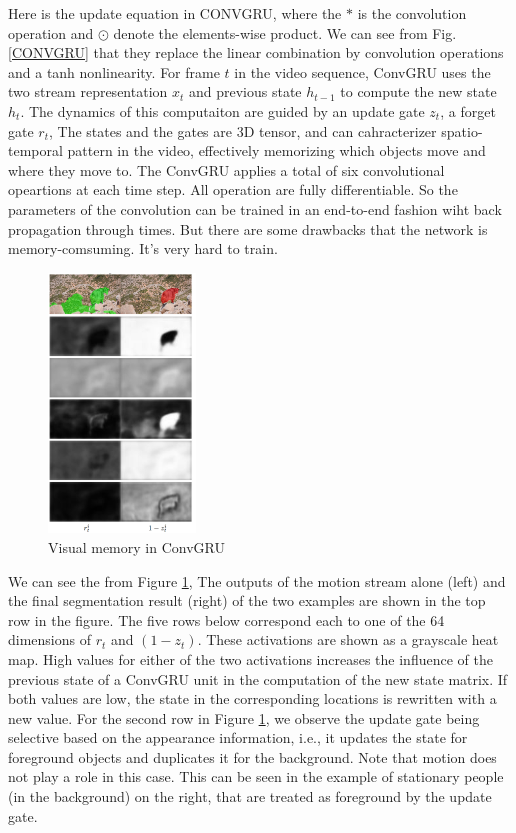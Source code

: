 Here is the update equation in CONVGRU, where the $*$ is the convolution operation and $\odot$ denote the elements-wise product.
We can see from Fig.\ref{CONVGRU} that they replace the linear combination by convolution operations and a tanh nonlinearity. For frame $t$ in the video
sequence, ConvGRU uses the two stream representation $x_t$ and previous state $h_{t-1}$ to compute the new state $h_t$. The dynamics of this computaiton 
are guided by an update gate $z_t$, a forget gate $r_t$, The states  and the gates are $3$D tensor, and can cahracterizer spatio-temporal pattern in
the video, effectively memorizing which objects move and where they move to. The ConvGRU applies a total of six convolutional opeartions at each time step.
All operation are fully differentiable. So the parameters of the convolution can be trained in an end-to-end fashion wiht back propagation through times.
But there are some drawbacks that the network is memory-comsuming. It's very hard to train. 
\begin{figure}[ht]
    \centering
    \includegraphics[width=0.35\textwidth]{figure/visual_memory.png}
    \caption{Visual memory in ConvGRU}
    \label{vis}
\end{figure}

We can see the from Figure \ref{vis}, The outputs of the motion stream alone (left) and the final segmentation result (right) of the two examples are
shown in the top row in the figure. The five rows below correspond each to one of the 64 dimensions of $r_t$ and $(1− z_t)$.
These activations are shown as a grayscale heat map. 
High values for either of the two activations increases the influence of the previous state of a ConvGRU unit in the computation of the new state matrix. 
If both values are low, the state in the corresponding locations is rewritten with a new value. 
For the second row in Figure \ref{vis}, we observe the update gate being selective based on the appearance information, i.e., it updates the
state for foreground objects and duplicates it for the background. Note that motion does not play a role in this case.
This can be seen in the example of stationary people (in the
background) on the right, that are treated as foreground by
the update gate.

